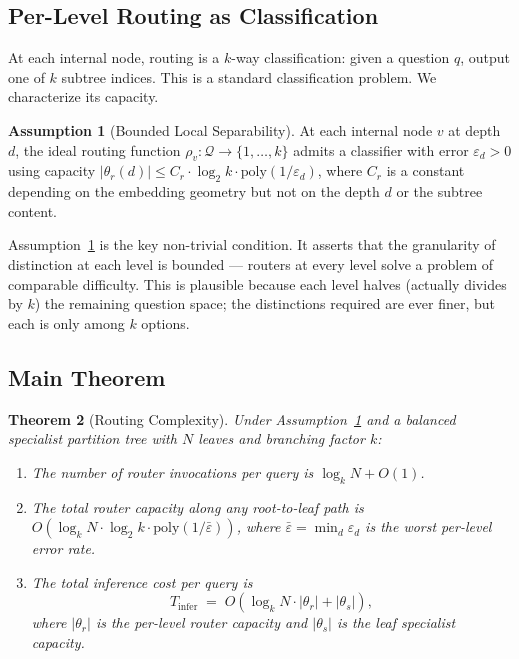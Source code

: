 \documentclass[11pt,twocolumn,a4paper]{article}
\newtheorem{theorem}{Theorem}[section]
\theoremstyle{definition}
\newtheorem{assumption}[theorem]{Assumption}
\theoremstyle{remark}
\newcommand{\Qc}{\mathcal{Q}}
\begin{document}
\subsection{Per-Level Routing as Classification}

At each internal node, routing is a $k$-way classification: given a question $q$, output one of $k$ subtree indices. This is a standard classification problem. We characterize its capacity.

\begin{assumption}[Bounded Local Separability]
\label{assum:sep}
At each internal node $v$ at depth $d$, the ideal routing function $\rho_v: \Qc \to \{1, \ldots, k\}$ admits a classifier with error $\varepsilon_d > 0$ using capacity $|\theta_r(d)| \leq C_r \cdot \log_2 k \cdot \mathrm{poly}(1/\varepsilon_d)$, where $C_r$ is a constant depending on the embedding geometry but not on the depth $d$ or the subtree content.
\end{assumption}

Assumption~\ref{assum:sep} is the key non-trivial condition. It asserts that the granularity of distinction at each level is bounded --- routers at every level solve a problem of comparable difficulty. This is plausible because each level halves (actually divides by $k$) the remaining question space; the distinctions required are ever finer, but each is only among $k$ options.

\subsection{Main Theorem}

\begin{theorem}[Routing Complexity]
\label{thm:route-complexity}
Under Assumption~\ref{assum:sep} and a balanced specialist partition tree with $N$ leaves and branching factor $k$:
\begin{enumerate}
    \item The number of router invocations per query is $\log_k N + O(1)$.
    \item The total router capacity along any root-to-leaf path is $O(\log_k N \cdot \log_2 k \cdot \mathrm{poly}(1/\bar\varepsilon))$, where $\bar\varepsilon = \min_d \varepsilon_d$ is the worst per-level error rate.
    \item The total inference cost per query is
    \[
    T_{\text{infer}} \;=\; O\!\left( \log_k N \cdot |\theta_r| + |\theta_s| \right),
    \]
    where $|\theta_r|$ is the per-level router capacity and $|\theta_s|$ is the leaf specialist capacity.
\end{enumerate}
\end{theorem}
\end{document}
